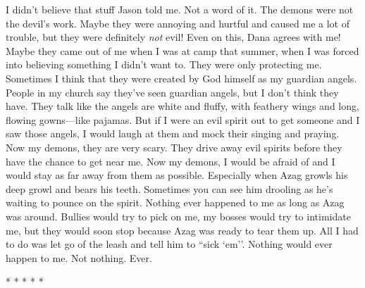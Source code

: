 I didn't believe that stuff Jason told me. Not a word of it. The demons
were not the devil's work. Maybe they were annoying and hurtful and
caused me a lot of trouble, but they were definitely \emph{not} evil!
Even on this, Dana agrees with me! Maybe they came out of me when I was
at camp that summer, when I was forced into believing something I didn't
want to. They were only protecting me. Sometimes I think that they were
created by God himself as my guardian angels. People in my church say
they've seen guardian angels, but I don't think they have. They talk
like the angels are white and fluffy, with feathery wings and long,
flowing gowns---like pajamas. But if I were an evil spirit out to get
someone and I saw those angels, I would laugh at them and mock their
singing and praying. Now my demons, they are very scary. They drive away
evil spirits before they have the chance to get near me. Now my demons,
I would be afraid of and I would stay as far away from them as possible.
Especially when Azag growls his deep growl and bears his teeth.
Sometimes you can see him drooling as he's waiting to pounce on the
spirit. Nothing ever happened to me as long as Azag was around. Bullies
would try to pick on me, my bosses would try to intimidate me, but they
would soon stop because Azag was ready to tear them up. All I had to do
was let go of the leash and tell him to ``sick `em''. Nothing would ever
happen to me. Not nothing. Ever.

* * * * *

